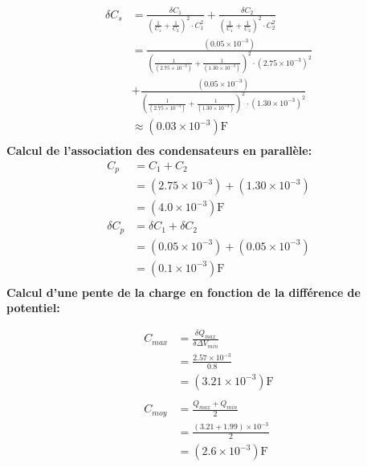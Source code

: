 \documentclass[11pt]{article}
\begin{document}
\begin{equation*}
\begin{split}
\delta C_{s}&= \frac{\delta C_{1}}{\left (\frac{1}{C_{1}}+\frac{1}{C_{2}}\right )^{2}\cdot C_{1}^{2}}+
               \frac{\delta C_{2}}{\left (\frac{1}{C_{1}}+\frac{1}{C_{2}}\right )^{2}\cdot C_{2}^{2}}\\
            &= \frac{(0.05\times 10^{-3})}{\left (\frac{1}{(2.75\times 10^{-3})}+
               \frac{1}{(1.30\times 10^{-3})}\right )^{2}\cdot (2.75\times 10^{-3})^{2}}\\
            &+ \frac{(0.05\times 10^{-3})}{\left (\frac{1}{(2.75\times 10^{-3})}+
               \frac{1}{(1.30\times 10^{-3})}\right )^{2}\cdot (1.30\times 10^{-3})^{2}}\\
            &\approx (0.03\times 10^{-3})\mathrm F\\
\end{split}
\end{equation*}
\bf Calcul de l'association des condensateurs en parallèle:
\begin{equation*}
\begin{split}
       C_{p}&= C_{1}+C_{2}\\
            &= (2.75\times 10^{-3})+(1.30\times 10^{-3})\\
            &= (4.0\times 10^{-3})\mathrm F\\
\delta C_{p}&= \delta C_{1}+\delta C_{2}\\
            &= (0.05\times 10^{-3})+(0.05\times 10^{-3})\\
            &= (0.1\times 10^{-3})\mathrm F\\
\end{split}
\end{equation*}
\bf Calcul d'une pente de la charge en fonction de la différence de potentiel:
\begin{minipage}{0.45\textwidth}
\begin{center}
\begin{equation*}
\begin{split}
 C_{max}&= \frac{\delta Q_{max}}{\delta\Delta V_{min}}\\
        &= \frac{2.57\times 10^{-3}}{0.8}\\
        &= (3.21\times 10^{-3})\mathrm F\\
        &\\
 C_{moy}&= \frac{Q_{max}+Q_{min}}{2}\\
        &= \frac{(3.21+1.99)\times 10^{-3}}{2}\\
        &= (2.6\times 10^{-3})\mathrm F\\
\end{split}
\end{equation*}
\end{center}
\end{minipage}
\end{document}
